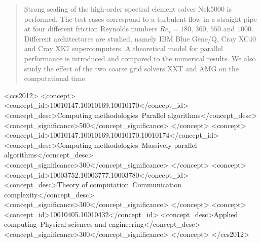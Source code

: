 \documentclass{sig-alternate}
\begin{document}
\maketitle
\begin{abstract}
Strong scaling of the high-order spectral element solver Nek5000 is performed. The test cases correspond to a turbulent flow in a straight pipe at four different friction Reynolds numbers $Re_{\tau} = 180$, $360$, $550$ and $1000$. Different architectures are studied, namely IBM Blue Gene/Q, Cray XC40 and Cray XK7 supercomputers. A theoretical model for parallel performance is introduced and compared to the numerical results. We also study the effect of the two coarse grid solvers XXT and AMG on the computational time.
\end{abstract}


%
 \begin{CCSXML}
<ccs2012>
<concept>
<concept_id>10010147.10010169.10010170</concept_id>
<concept_desc>Computing methodologies~Parallel algorithms</concept_desc>
<concept_significance>500</concept_significance>
</concept>
<concept>
<concept_id>10010147.10010169.10010170.10010174</concept_id>
<concept_desc>Computing methodologies~Massively parallel algorithms</concept_desc>
<concept_significance>300</concept_significance>
</concept>
<concept>
<concept_id>10003752.10003777.10003780</concept_id>
<concept_desc>Theory of computation~Communication complexity</concept_desc>
<concept_significance>300</concept_significance>
</concept>
<concept>
<concept_id>10010405.10010432</concept_id>
<concept_desc>Applied computing~Physical sciences and engineering</concept_desc>
<concept_significance>300</concept_significance>
</concept>
</ccs2012>
\end{CCSXML}



%
%

%
%
\printccsdesc


\end{document}
